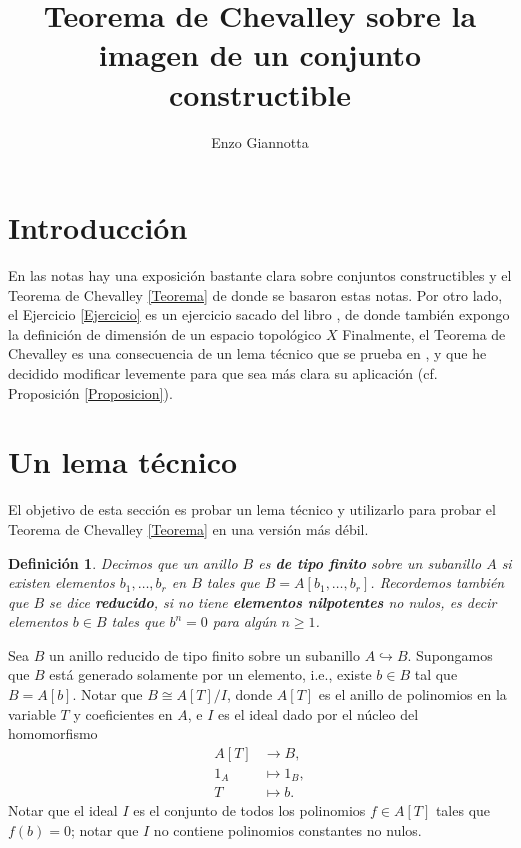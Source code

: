 \documentclass[12pt]{article}
\title{Teorema de Chevalley sobre la imagen de un conjunto constructible}
\author{Enzo Giannotta}
\theoremstyle{customTheorem}
\theoremstyle{customDefinition}
\newtheorem{definition}[theorem]{Definición}
\newcommand{\fiveknot}{%
\begin{tikzpicture}[transform canvas={scale=0.1}]
\begin{knot}[
  consider self intersections=true,
  flip crossing/.list={2,4},
  only when rendering/.style={
  }
]
\strand[black, line width=8pt] (2,0) .. controls +(0,1) and +(54:1.0) .. (144:2) .. controls +(54:-1.0) and +(18:-1.0) .. (-72:2) .. controls +(18:1.0) and +(162:-1.0) .. (72:2) .. controls +(162:1.0) and +(126:1.0) .. (-144:2) .. controls +(126:-1.0) and +(0,-1.0) .. (2,0);
\end{knot}
\end{tikzpicture}
}
\begin{document}

\maketitle


\tableofcontents


\section{Introducción}
En las notas \cite[Capítulo 3, última sección]{mustata2017ag} hay una exposición bastante clara sobre conjuntos constructibles y el Teorema de Chevalley \ref{Teorema} de donde se basaron estas notas. Por otro lado, el Ejercicio \ref{Ejercicio} es un ejercicio sacado del libro \cite[Ejercicio 1.10]{hartshorne2013algebraic}, de donde también expongo la definición de dimensión de un espacio topológico $X$ Finalmente, el Teorema de Chevalley es una consecuencia de un lema técnico que se prueba en \cite[Proposición 1.9.4.]{springer1998linear}, y que he decidido modificar levemente para que sea más clara su aplicación (cf. Proposición \ref{Proposicion}).






\section{Un lema técnico}
El objetivo de esta sección es probar un lema técnico y utilizarlo para probar el Teorema de Chevalley \ref{Teorema} en una versión más débil.

\begin{definition}
    Decimos que un anillo $B$ es \textbf{de tipo finito} sobre un subanillo $A$ si existen elementos $b_1, \ldots, b_r$ en $B$ tales que $B = A[b_1, \ldots, b_r]$. Recordemos también que $B$ se dice \textbf{reducido}, si no tiene \textbf{elementos nilpotentes} no nulos, es decir elementos $b \in B$ tales que $b^n = 0$ para algún $n \geq 1$.
\end{definition}

Sea $B$ un anillo reducido de tipo finito sobre un subanillo $A \hookrightarrow B$. Supongamos que $B$ está generado solamente por un elemento, i.e., existe $b \in B$ tal que $B = A[b]$. Notar que $B \cong A[T]/I$, donde $A[T]$ es el anillo de polinomios en la variable $T$ y coeficientes en $A$, e $I$ es el ideal dado por el núcleo del homomorfismo
\begin{align*}
        A[T] &\longrightarrow B, \\
        1_A &\longmapsto 1_B, \\
        T &\longmapsto b.
\end{align*}
Notar que el ideal $I$ es el conjunto de todos los polinomios $f \in A[T]$ tales que $f(b) = 0$; notar que $I$ no contiene polinomios constantes no nulos.
\end{document}

